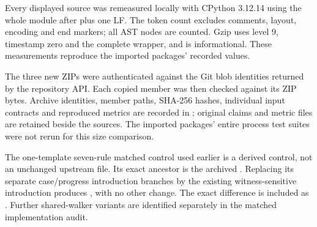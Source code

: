 Every displayed source was remeasured locally with CPython 3.12.14 using
the whole module after  plus one LF.
The token count excludes comments, layout, encoding and end markers;
all AST nodes are counted. Gzip uses level 9, timestamp zero and the
complete wrapper, and is informational. These measurements reproduce
the imported packages' recorded values.

The three new ZIPs were authenticated against the Git blob identities
returned by the repository API. Each copied member was then checked
against its ZIP bytes. Archive identities, member paths, SHA-256 hashes,
individual input contracts and reproduced metrics are recorded in
; original claims and metric files
are retained beside the sources. The imported packages' entire process
test suites were not rerun for this size comparison.

The one-template seven-rule matched control used earlier is a derived
control, not an unchanged upstream file. Its exact ancestor is the
archived . Replacing its separate
case/progress introduction branches by the existing witness-sensitive
introduction produces , with no
other change. The exact difference is included as
. Further shared-walker
variants are identified separately in the matched implementation audit.
